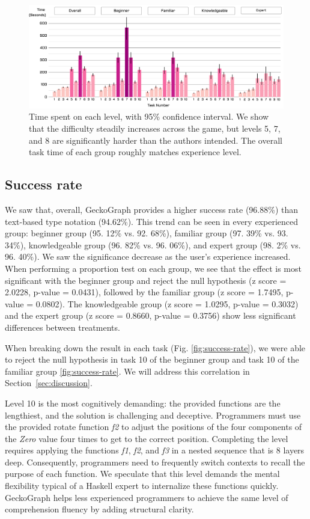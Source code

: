\documentclass[preprint,12pt]{elsarticle}
\begin{document}
\begin{figure}[]
  \includegraphics[width=\linewidth]{figures/LevelTime}
  \caption{\label{fig:level-time} Time spent on each level, with 95\% confidence interval. We show that the difficulty steadily increases across the game, but levels 5, 7, and 8 are significantly harder than the authors intended. The overall task time of each group roughly matches experience level.}
\end{figure}

\subsection{Success rate}
We saw that, overall, GeckoGraph provides a higher success rate (96.88\%) than text-based type notation (94.62\%). This trend can be seen in every experienced group: beginner group (95. 12\% vs. 92. 68\%), familiar group (97. 39\% vs. 93. 34\%), knowledgeable group (96. 82\% vs. 96. 06\%), and expert group (98. 2\% vs. 96. 40\%). We saw the significance decrease as the user's experience increased. When performing a proportion test on each group, we see that the effect is most significant with the beginner group and reject the null hypothesis (z score = 2.0228, p-value = 0.0431), followed by the familiar group (z score = 1.7495, p-value = 0.0802). The knowledgeable group (z score = 1.0295, p-value = 0.3032) and the expert group (z score = 0.8660, p-value = 0.3756) show less significant differences between treatments. 

When breaking down the result in each task (Fig. \ref{fig:success-rate}), we were able to reject the null hypothesis in task 10 of the beginner group and task 10 of the familiar group \ref{fig:success-rate}. We will address this correlation in Section~\ref{sec:discussion}.

Level 10 is the most cognitively demanding: the provided functions are the lengthiest, and the solution is challenging and deceptive. Programmers must use the provided rotate function {\it f2} to adjust the positions of the four components of the {\it Zero} value four times to get to the correct position. Completing the level requires applying the functions {\it f1}, {\it f2}, and {\it f3} in a nested sequence that is 8 layers deep. Consequently, programmers need to frequently switch contexts to recall the purpose of each function. We speculate that this level demands the mental flexibility typical of a Haskell expert to internalize these functions quickly. GeckoGraph helps less experienced programmers to achieve the same level of comprehension fluency by adding structural clarity.
\end{document}
